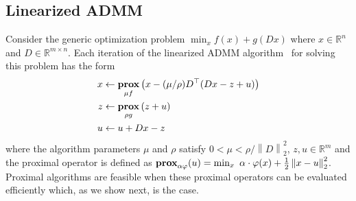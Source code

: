 \documentclass[letterpaper]{article} %
\newcommand{\autoref}{\Cref}
\newcommand{\norm}[1]{\left\lVert #1 \right\rVert}
\DeclareMathOperator*{\prox}{\bf prox}
\begin{document}
\subsection{Linearized ADMM}
\label{sec:linADMM}


Consider the generic optimization problem
$\min_x f(x)+g(Dx)$
where $x\in \mathbb{R}^n$ and $D\in \mathbb{R}^{m\times n}$. Each
iteration of the linearized ADMM
algorithm~\cite{parikh_proximal_2014} for solving this problem 
has the form
\begin{equation}
  \label{eq:linADMM_steps}
  \begin{aligned}
    x & \leftarrow \prox_{\mu f} \left(x - (\mu/\rho)D^\top (D x - z + u )\right)\\
    z & \leftarrow \prox_{\rho g} \left(z + u\right)\\
    u & \leftarrow u + D x - z
  \end{aligned}
\end{equation}
where the algorithm parameters $\mu$ and $\rho$ satisfy $0 < \mu <
\rho/\norm{D}_2^2$, $z,u\in \mathbb{R}^m$ and the proximal operator is
defined as $\prox_{\alpha \varphi}(u) = \min_x \,\, \alpha \cdot
\varphi(x)+\frac{1}{2} \norm{ x-u}_2^2$. Proximal algorithms are feasible
when these proximal operators can be evaluated efficiently which, as
we show next, is the case.  

 
\end{document}

